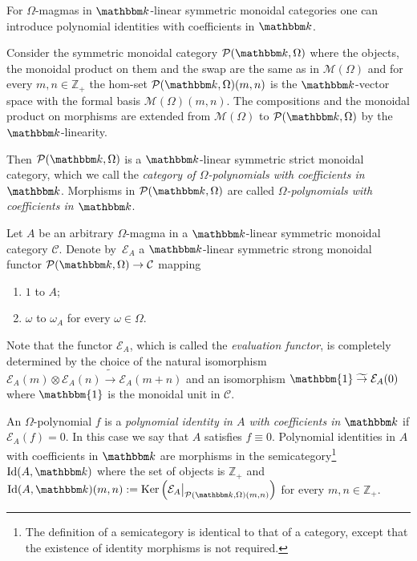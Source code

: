 \documentclass[12pt, reqno, a4paper]{amsart}
\theoremstyle{plain}
\theoremstyle{remark}
\theoremstyle{definition}
\numberwithin{equation}{section}
\DeclareMathOperator{\Id}{Id}
\DeclareMathOperator{\Ker}{Ker}
\begin{document}
 For $\Omega$-magmas in $\mathbbm k$-linear symmetric monoidal categories one can introduce polynomial identities with coefficients in $\mathbbm k$.
 
 Consider the symmetric monoidal category
 $\mathcal P(\mathbbm k, \Omega)$ where the objects, the monoidal product on them and the swap are the same as in $\mathcal M(\Omega)$
 and for every $m,n\in\mathbb{Z}_+$ the hom-set
 $\mathcal P(\mathbbm k, \Omega)(m,n)$ is the $\mathbbm k$-vector space with the formal basis $\mathcal M(\Omega)(m,n)$.
 The compositions and the monoidal product on morphisms are extended from $\mathcal M(\Omega)$ to
 $\mathcal P(\mathbbm k, \Omega)$ by the $\mathbbm k$-linearity.
 
 Then  $\mathcal P(\mathbbm k, \Omega)$ is a $\mathbbm k$-linear symmetric strict monoidal category, which we call the \textit{category of $\Omega$-polynomials with coefficients in $\mathbbm k$}. Morphisms in $\mathcal P(\mathbbm k, \Omega)$ are called \textit{$\Omega$-polynomials with coefficients in $\mathbbm k$}. 
  
 Let $A$ be an arbitrary $\Omega$-magma in a $\mathbbm k$-linear symmetric monoidal category $\mathcal C$. Denote by~$\mathcal E_A$ a $\mathbbm k$-linear symmetric strong monoidal functor $\mathcal P(\mathbbm k, \Omega) \to \mathcal C$ mapping
 \begin{enumerate}
 	\item  $1$ to $A$;
 	\item $\omega$ to $\omega_A$ for every $\omega \in \Omega$.
 \end{enumerate}
  Note that the functor $\mathcal E_A$, which is called the \textit{evaluation functor}, is completely determined by the choice of the natural isomorphism $\mathcal E_A(m)\otimes \mathcal E_A(n) \mathrel{\widetilde\to} \mathcal E_A(m+n)$ and an isomorphism $\mathbbm{1} \mathrel{\widetilde\to} \mathcal E_A(0)$ where $\mathbbm{1}$ is the monoidal unit in $\mathcal C$.
  
 An $\Omega$-polynomial $f$ is a \textit{polynomial identity in $A$ with coefficients in $\mathbbm k$}  if $\mathcal E_A(f) = 0$. In this case we say that $A$ satisfies $f\equiv 0$. Polynomial identities in $A$ with coefficients in $\mathbbm k$ are morphisms in the semicategory\footnote{The definition of a semicategory is identical to that of a category, except that the existence of identity morphisms is not required.} $\Id(A,\mathbbm k)$ where the set of objects is $\mathbb Z_+$ and $\Id(A,\mathbbm k)(m,n) := \Ker \left(\mathcal E_A \bigr|_{\mathcal P(\mathbbm k, \Omega)(m,n)}\right)$
 for every $m,n\in\mathbb Z_+$.
 
\end{document}
